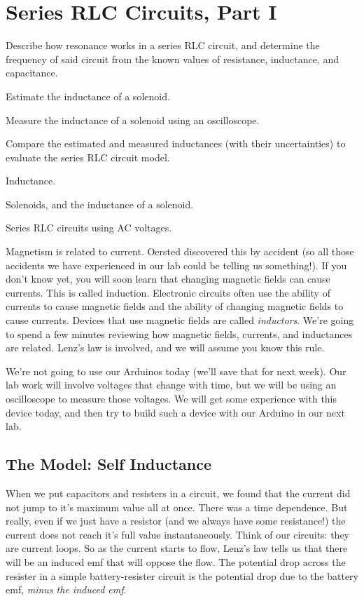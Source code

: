 \chapter{Series RLC Circuits, Part I}

\objectives
{
\item Describe how resonance works in a series RLC circuit, and determine
	the frequency of said circuit from the known values of resistance,
	inductance, and capacitance.
\item Estimate the inductance of a solenoid.
\item Measure the inductance of a solenoid using an oscilloscope.
\item Compare the estimated and measured inductances (with their uncertainties)
	to evaluate the series RLC circuit model.
}
\review
{
\item Inductance.
\item Solenoids, and the inductance of a solenoid.
\item Series RLC circuits using AC voltages.
}

Magnetism is
related to current. Oersted discovered this by accident (so all those
accidents we have experienced in our lab could be telling us something!). If
you don't know yet, you will soon learn that changing magnetic fields can
cause currents. This is called induction. Electronic circuits often use the
ability of currents to cause magnetic fields and the ability of changing
magnetic fields to cause currents. Devices that use magnetic fields are
called \emph{inductors}. We're going to spend a few minutes reviewing how
magnetic fields, currents, and inductances are related. Lenz's law is
involved, and we will assume you know this rule.

We're not going to use our Arduinos today (we'll save that for next week). 
Our lab work will involve voltages that change with time, but we will be 
using an oscilloscope to measure those voltages. We
will get some experience with this device today, and then try to build such
a device with our Arduino in our next lab.

\section{The Model: Self Inductance}

When we put capacitors and resisters in a circuit, we found that the current
did not jump to it's maximum value all at once. There was a time dependence.
But really, even if we just have a resistor (and we always have some
resistance!) the current does not reach it's full value instantaneously.
Think of our circuits: they are current loops. So as the current starts to
flow, Lenz's law tells us that there will be an induced emf that will oppose
the flow. The potential drop across the resister in a simple
battery-resister circuit is the potential drop due to the battery emf, \emph{%
minus the induced emf}.

